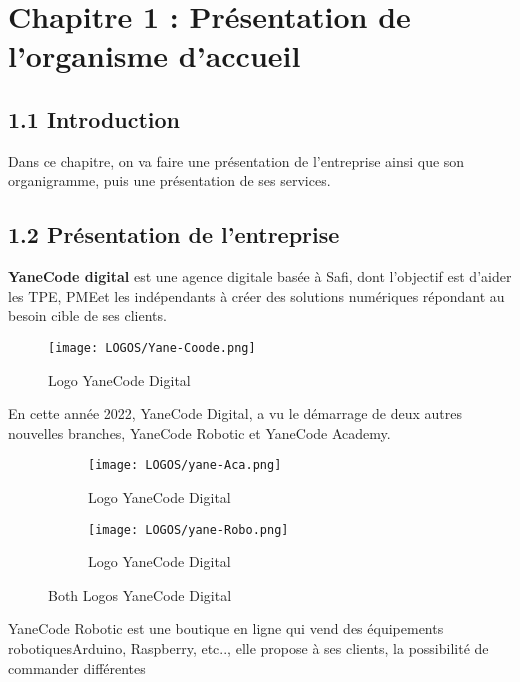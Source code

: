 \chapter*{\Huge  Chapitre 1 : Présentation de l’organisme d’accueil
 }

\section*{1.1 Introduction}

Dans ce chapitre, on va faire une présentation de l’entreprise ainsi que son
organigramme, puis une présentation de ses services.\\

\section*{1.2 Présentation de l'entreprise}
\textbf{YaneCode digital}
 est une agence digitale basée à Safi, dont l’objectif est d’aider les
TPE, PMEet les indépendants à créer des solutions numériques répondant au besoin cible de
ses clients.
\medskip

\begin{figure}[h]
\centering
\texttt{[image: LOGOS/Yane-Coode.png]}
\caption{Logo YaneCode Digital}
\label{fig:image-label}
\end{figure}



\medskip
En cette année 2022, YaneCode Digital, a vu le démarrage de deux autres nouvelles branches,
YaneCode Robotic et YaneCode Academy.\\
\begin{figure}[h]
\centering
\begin{subfigure}[b]{0.5\textwidth}
\centering
\texttt{[image: LOGOS/yane-Aca.png]}
\caption{Logo YaneCode Digital}
\label{fig:subfig1}
\end{subfigure}%
\begin{subfigure}[b]{0.5\textwidth}
\centering
\texttt{[image: LOGOS/yane-Robo.png]}
\caption{Logo YaneCode Digital}
\label{fig:subfig2}
\end{subfigure}
\caption{Both Logos YaneCode Digital}
\label{fig:image-label}
\end{figure}

YaneCode Robotic est une boutique en ligne qui vend des équipements robotiquesArduino, Raspberry, etc.., elle propose à ses clients, la possibilité de commander différentes\\
\medskip


